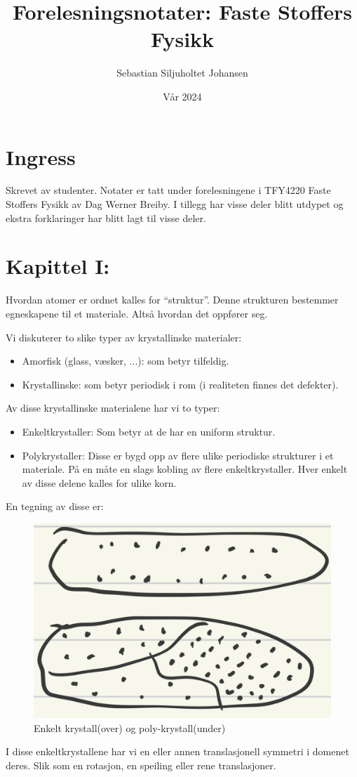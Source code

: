 \documentclass{article}
\title{Forelesningsnotater: Faste Stoffers Fysikk}
\author{Sebastian Siljuholtet Johansen }
\date{Vår 2024}
\begin{document}
\maketitle

\newpage
\section*{Ingress}
Skrevet av studenter. Notater er tatt under forelesningene i TFY4220 Faste Stoffers Fysikk av Dag Werner Breiby. I tillegg har visse deler blitt utdypet og ekstra forklaringer har blitt lagt til visse deler.
\newpage
\tableofcontents

\newpage
\section{Kapittel I: }
Hvordan atomer er ordnet kalles for \enquote{struktur}. Denne strukturen bestemmer egneskapene til et materiale. Altså hvordan det oppfører seg.

Vi diskuterer to slike typer av krystallinske materialer:
\begin{itemize}
    \item Amorfisk (glass, væsker, ...): som betyr tilfeldig.
    \item Krystallinske: som betyr periodisk i rom (i realiteten finnes det defekter).
\end{itemize}
Av disse krystallinske materialene har vi to typer:
\begin{itemize}
    \item Enkeltkrystaller: Som betyr at de har en uniform struktur.
    \item Polykrystaller: Disse er bygd opp av flere ulike periodiske strukturer i et materiale. På en måte en slags kobling av flere enkeltkrystaller. Hver enkelt av disse delene kalles for ulike korn. 
\end{itemize}
En tegning av disse er:
\begin{figure}
    \centering
    \includegraphics[width=0.5\linewidth]{bilder/enkelt_poly_krystaller.png}
    \caption{Enkelt krystall(over) og poly-krystall(under)}
    \label{fig:enkelt_poly_krystaller}
\end{figure}
I disse enkeltkrystallene har vi en eller annen translasjonell symmetri i domenet deres. Slik som en rotasjon, en speiling eller rene translasjoner.
\end{document}
